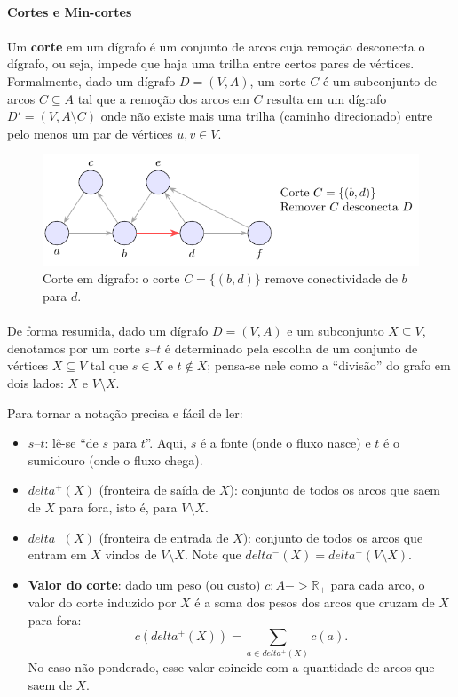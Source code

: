 \documentclass[12pt,a4paper]{article}
\def\emph#1{#1}%
\def\to{->}%
\def\delta{delta}%
\begin{document}
\paragraph{Cortes e Min-cortes}
\paragraph{}
Um \textbf{corte} em um dígrafo é um conjunto de arcos cuja remoção desconecta o dígrafo, ou seja, impede que haja uma trilha entre certos pares de vértices. Formalmente, dado um dígrafo \(D = (V, A)\), um corte \(C\) é um subconjunto de arcos \(C \subseteq A\) tal que a remoção dos arcos em \(C\) resulta em um dígrafo \(D' = (V, A \setminus C)\) onde não existe mais uma trilha (caminho direcionado) entre pelo menos um par de vértices \(u, v \in V\).


\begin{figure}[H]
    \centering
    \includegraphics[width=0.9\linewidth]{figures/fig_corte.pdf}

    \caption{Corte em dígrafo: o corte $C=\{(b,d)\}$ remove conectividade de $b$ para $d$.}
    \label{fig:corte}
\end{figure}


\paragraph{}
De forma resumida, dado um dígrafo \(D=(V,A)\) e um subconjunto \(X\subseteq V\), denotamos por um corte \(s\text{--}t\) é determinado pela escolha de um conjunto de vértices \(X\subseteq V\) tal que \(s\in X\) e \(t\notin X\); pensa-se nele como a “divisão” do grafo em dois lados: \(X\) e \(V\setminus X\).

Para tornar a notação precisa e fácil de ler:
\begin{itemize}
    \item \textbf{\(s\text{--}t\)}: lê-se “de \(s\) para \(t\)”. Aqui, \(s\) é a fonte (onde o fluxo nasce) e \(t\) é o sumidouro (onde o fluxo chega).
    \item \textbf{\(\delta^+(X)\)} (fronteira de saída de \(X\)): conjunto de todos os arcos que \emph{saem} de \(X\) para fora, isto é, para \(V\setminus X\).
    \item \textbf{\(\delta^-(X)\)} (fronteira de entrada de \(X\)): conjunto de todos os arcos que \emph{entram} em \(X\) vindos de \(V\setminus X\). Note que \(\delta^-(X)=\delta^+(V\setminus X)\).
    \item \textbf{Valor do corte}: dado um peso (ou custo) \(c:A\to\mathbb{R}_+\) para cada arco, o valor do corte induzido por \(X\) é a soma dos pesos dos arcos que cruzam de \(X\) para fora:
          \[c(\delta^+(X))=\sum_{a\in\delta^+(X)} c(a).\]
          No caso não ponderado, esse valor coincide com a \emph{quantidade} de arcos que saem de \(X\).
\end{itemize}
\end{document}

